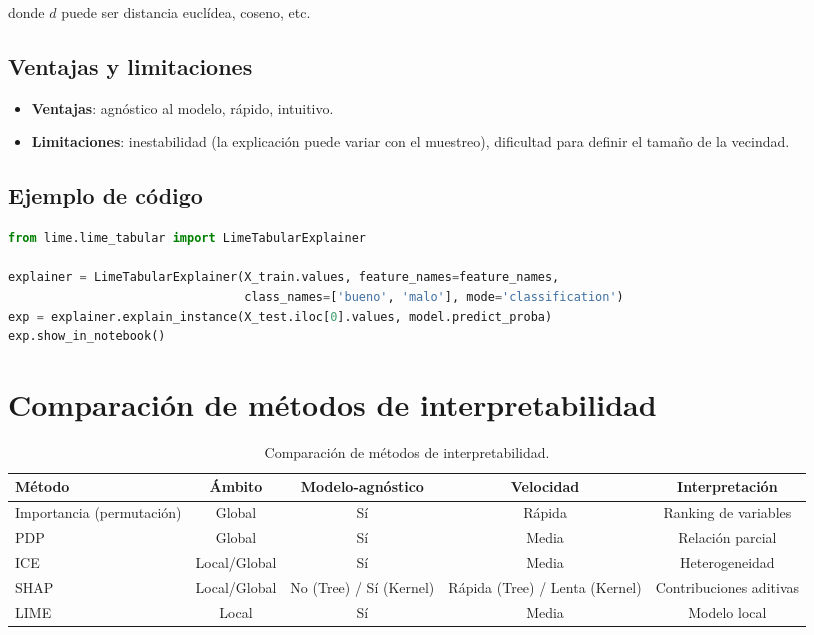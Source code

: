 \documentclass[12pt,a4paper,openany,oneside]{book}
\begin{document}
donde \(d\) puede ser distancia euclídea, coseno, etc.

\subsection{Ventajas y limitaciones}
\begin{itemize}
    \item \textbf{Ventajas}: agnóstico al modelo, rápido, intuitivo.
    \item \textbf{Limitaciones}: inestabilidad (la explicación puede variar con el muestreo), dificultad para definir el tamaño de la vecindad.
\end{itemize}

\subsection{Ejemplo de código}
\begin{lstlisting}[language=Python]
from lime.lime_tabular import LimeTabularExplainer

explainer = LimeTabularExplainer(X_train.values, feature_names=feature_names,
                                 class_names=['bueno', 'malo'], mode='classification')
exp = explainer.explain_instance(X_test.iloc[0].values, model.predict_proba)
exp.show_in_notebook()
\end{lstlisting}

\section{Comparación de métodos de interpretabilidad}

\begin{table}[h]
\centering
\begin{tabular}{|l|c|c|c|c|}
\hline
\textbf{Método} & \textbf{Ámbito} & \textbf{Modelo-agnóstico} & \textbf{Velocidad} & \textbf{Interpretación} \\
\hline
Importancia (permutación) & Global & Sí & Rápida & Ranking de variables \\
PDP & Global & Sí & Media & Relación parcial \\
ICE & Local/Global & Sí & Media & Heterogeneidad \\
SHAP & Local/Global & No (Tree) / Sí (Kernel) & Rápida (Tree) / Lenta (Kernel) & Contribuciones aditivas \\
LIME & Local & Sí & Media & Modelo local \\
\hline
\end{tabular}
\caption{Comparación de métodos de interpretabilidad.}
\end{table}
\end{document}
